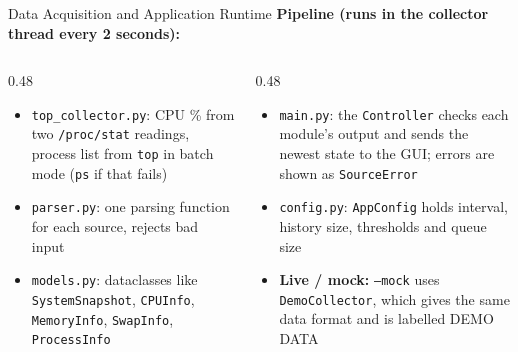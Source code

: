 \documentclass[aspectratio=169,10pt]{beamer}
\begin{document}
\begin{frame}{Data Acquisition and Application Runtime}
\small
\textbf{Pipeline (runs in the collector thread every 2 seconds):}

\vspace{0.1cm}

\vspace{0.3cm}
\begin{columns}[T]
\begin{column}{0.48\textwidth}
\begin{itemize}
  \item \texttt{top\_collector.py}: CPU \% from two \texttt{/proc/stat} readings,
        process list from \texttt{top} in batch mode (\texttt{ps} if that fails)
  \item \texttt{parser.py}: one parsing function for each source, rejects bad input
  \item \texttt{models.py}: dataclasses like \texttt{SystemSnapshot}, \texttt{CPUInfo},
        \texttt{MemoryInfo}, \texttt{SwapInfo}, \texttt{ProcessInfo}
\end{itemize}
\end{column}
\begin{column}{0.48\textwidth}
\begin{itemize}
  \item \texttt{main.py}: the \texttt{Controller} checks each module's output and
        sends the newest state to the GUI; errors are shown as \texttt{SourceError}
  \item \texttt{config.py}: \texttt{AppConfig} holds interval, history size,
        thresholds and queue size
  \item \textbf{Live / mock:} \texttt{--mock} uses \texttt{DemoCollector}, which gives
        the same data format and is labelled DEMO DATA
\end{itemize}
\end{column}
\end{columns}
\end{frame}
\end{document}
